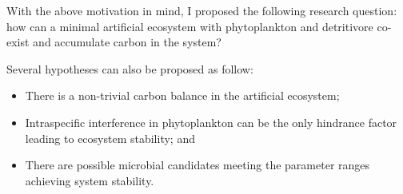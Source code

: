 \documentclass[../thesis.tex]{subfiles} %
\begin{document}
With the above motivation in mind, I proposed the following research question: how can a minimal artificial ecosystem with phytoplankton and detritivore co-exist and accumulate carbon in the system?

Several hypotheses can also be proposed as follow:
\begin{itemize}
    \item There is a non-trivial carbon balance in the artificial ecosystem;
    \item Intraspecific interference in phytoplankton can be the only hindrance factor leading to ecosystem stability; and
    \item There are possible microbial candidates meeting the parameter ranges achieving system stability.
\end{itemize}
\end{document}
